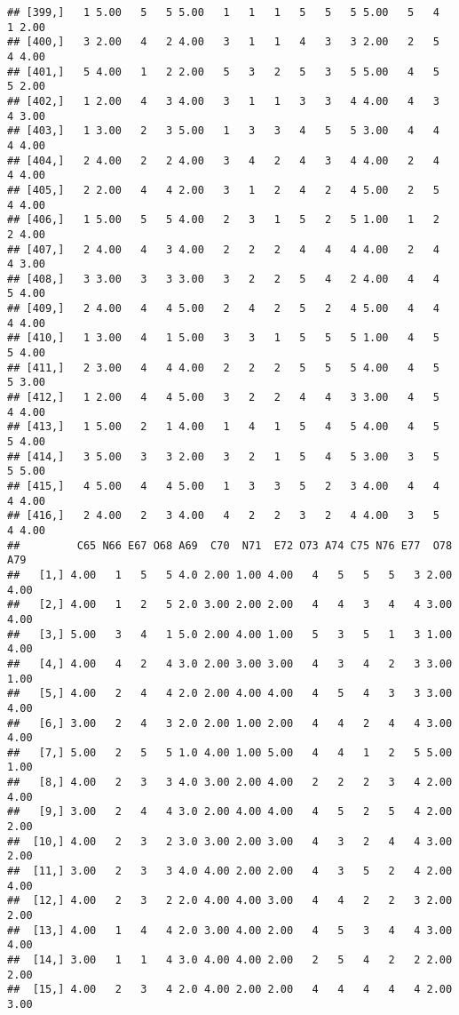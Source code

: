 \documentclass[]{article}
\begin{document}
\begin{verbatim}
## [399,]   1 5.00   5   5 5.00   1   1   1   5   5   5 5.00   5   4   1 2.00
## [400,]   3 2.00   4   2 4.00   3   1   1   4   3   3 2.00   2   5   4 4.00
## [401,]   5 4.00   1   2 2.00   5   3   2   5   3   5 5.00   4   5   5 2.00
## [402,]   1 2.00   4   3 4.00   3   1   1   3   3   4 4.00   4   3   4 3.00
## [403,]   1 3.00   2   3 5.00   1   3   3   4   5   5 3.00   4   4   4 4.00
## [404,]   2 4.00   2   2 4.00   3   4   2   4   3   4 4.00   2   4   4 4.00
## [405,]   2 2.00   4   4 2.00   3   1   2   4   2   4 5.00   2   5   4 4.00
## [406,]   1 5.00   5   5 4.00   2   3   1   5   2   5 1.00   1   2   2 4.00
## [407,]   2 4.00   4   3 4.00   2   2   2   4   4   4 4.00   2   4   4 3.00
## [408,]   3 3.00   3   3 3.00   3   2   2   5   4   2 4.00   4   4   5 4.00
## [409,]   2 4.00   4   4 5.00   2   4   2   5   2   4 5.00   4   4   4 4.00
## [410,]   1 3.00   4   1 5.00   3   3   1   5   5   5 1.00   4   5   5 4.00
## [411,]   2 3.00   4   4 4.00   2   2   2   5   5   5 4.00   4   5   5 3.00
## [412,]   1 2.00   4   4 5.00   3   2   2   4   4   3 3.00   4   5   4 4.00
## [413,]   1 5.00   2   1 4.00   1   4   1   5   4   5 4.00   4   5   5 4.00
## [414,]   3 5.00   3   3 2.00   3   2   1   5   4   5 3.00   3   5   5 5.00
## [415,]   4 5.00   4   4 5.00   1   3   3   5   2   3 4.00   4   4   4 4.00
## [416,]   2 4.00   2   3 4.00   4   2   2   3   2   4 4.00   3   5   4 4.00
##         C65 N66 E67 O68 A69  C70  N71  E72 O73 A74 C75 N76 E77  O78  A79
##   [1,] 4.00   1   5   5 4.0 2.00 1.00 4.00   4   5   5   5   3 2.00 4.00
##   [2,] 4.00   1   2   5 2.0 3.00 2.00 2.00   4   4   3   4   4 3.00 4.00
##   [3,] 5.00   3   4   1 5.0 2.00 4.00 1.00   5   3   5   1   3 1.00 4.00
##   [4,] 4.00   4   2   4 3.0 2.00 3.00 3.00   4   3   4   2   3 3.00 1.00
##   [5,] 4.00   2   4   4 2.0 2.00 4.00 4.00   4   5   4   3   3 3.00 4.00
##   [6,] 3.00   2   4   3 2.0 2.00 1.00 2.00   4   4   2   4   4 3.00 4.00
##   [7,] 5.00   2   5   5 1.0 4.00 1.00 5.00   4   4   1   2   5 5.00 1.00
##   [8,] 4.00   2   3   3 4.0 3.00 2.00 4.00   2   2   2   3   4 2.00 4.00
##   [9,] 3.00   2   4   4 3.0 2.00 4.00 4.00   4   5   2   5   4 2.00 2.00
##  [10,] 4.00   2   3   2 3.0 3.00 2.00 3.00   4   3   2   4   4 3.00 2.00
##  [11,] 3.00   2   3   3 4.0 4.00 2.00 2.00   4   3   5   2   4 2.00 4.00
##  [12,] 4.00   2   3   2 2.0 4.00 4.00 3.00   4   4   2   2   3 2.00 2.00
##  [13,] 4.00   1   4   4 2.0 3.00 4.00 2.00   4   5   3   4   4 3.00 4.00
##  [14,] 3.00   1   1   4 3.0 4.00 4.00 2.00   2   5   4   2   2 2.00 2.00
##  [15,] 4.00   2   3   4 2.0 4.00 2.00 2.00   4   4   4   4   4 2.00 3.00

\end{verbatim}
\end{document}
